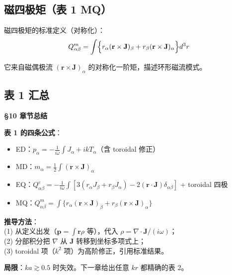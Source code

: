 \subsection{磁四极矩（表 1 MQ）}

磁四极矩的标准定义（对称化）：
\begin{equation}
  Q^m_{\alpha\beta} = \int\Bigl\{
    r_\alpha(\mathbf{r}\times\mathbf{J})_\beta + r_\beta(\mathbf{r}\times\mathbf{J})_\alpha\Bigr\}d^3r
\end{equation}

它来自磁偶极流 $(\mathbf{r}\times\mathbf{J})_\alpha$ 的对称化一阶矩，描述环形磁流模式。

\subsection{表 1 汇总}

\begin{chaptersummary}

\textbf{\S10 章节总结}

\textbf{表 1 的四条公式}：
\begin{itemize}
  \item ED：$p_\alpha = -\frac{1}{i\omega}\int J_\alpha + ikT_\alpha$（含 toroidal 修正）
  \item MD：$m_\alpha = \frac12\int(\mathbf{r}\times\mathbf{J})_\alpha$
  \item EQ：$Q^e_{\alpha\beta} = -\frac{1}{i\omega}\int[3(r_\alpha J_\beta+r_\beta J_\alpha)-2(\mathbf{r}\cdot\mathbf{J})\delta_{\alpha\beta}]$ + toroidal 四极
  \item MQ：$Q^m_{\alpha\beta} = \int\{r_\alpha(\mathbf{r}\times\mathbf{J})_\beta + r_\beta(\mathbf{r}\times\mathbf{J})_\alpha\}$
\end{itemize}

\textbf{推导方法}：\\
(1) 从定义出发（$\mathbf{p}=\int\mathbf{r}\rho$ 等），代入 $\rho = \nabla\cdot\mathbf{J}/(i\omega)$；\\
(2) 分部积分把 $\nabla$ 从 $\mathbf{J}$ 转移到坐标多项式上；\\
(3) toroidal 项（$k^2$ 项）为高阶修正，引用标准结果。

\textbf{局限}：$ka\gtrsim0.5$ 时失效。下一章给出任意 $kr$ 都精确的表 2。

\end{chaptersummary}

\newpage
